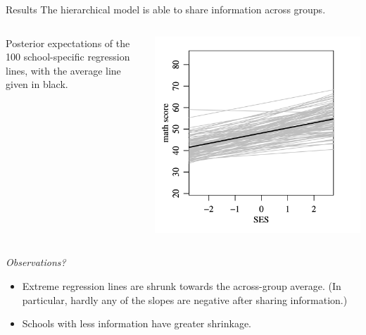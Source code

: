 \documentclass[10pt]{beamer}
\begin{document}
\begin{frame}{Results}
The hierarchical model is able to share information across groups. 
\begin{columns}
\begin{column}{.45\textwidth}
Posterior expectations of the 100 school-specific regression lines, with the average line given in black.	
\end{column}
\begin{column}{.45\textwidth}
\begin{center}
\includegraphics[width=\textwidth]{images/hoff_smoothed_linreg_lines} 
\end{center}
\end{column}
\end{columns}


\textit{Observations?} \pause
\begin{itemize}
\item Extreme regression lines are shrunk towards the across-group average. {\tiny (In particular, hardly any of the slopes are negative after sharing information.)}
\item Schools with less information have greater shrinkage.
\end{itemize}
\end{frame}
\end{document}
